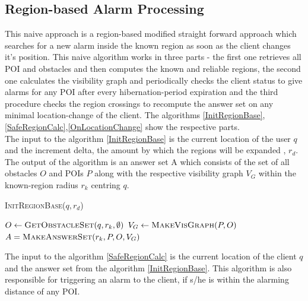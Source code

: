 \documentclass{sig-alternate}
\begin{document}
\subsection{Region-based Alarm Processing}
This naive approach is a region-based modified straight forward approach which searches for a new alarm inside the known region as soon as the client changes it's position.
This naive algorithm works in three parts - the first one retrieves all POI and obstacles and then computes the known and reliable regions, the second one calculates the visibility graph and periodically checks the client status to give alarms for any POI after every hibernation-period expiration and the third procedure checks the region crossings to recompute the answer set on any minimal location-change of the client.
The algorithms \ref{InitRegionBase},\ref{SafeRegionCalc},\ref{OnLocationChange} show the respective parts.\\
The input to the algorithm \ref{InitRegionBase} is the current location of the user $q$ and the increment delta, the amount by which the regions will be expanded , $r_d$. The output of the algorithm is an answer set A which consists of the set of all obstacles $O$ and POIs $P$ along with the respective visibility graph $V_G$ within the known-region radius $r_{k}$ centring $q$.

\begin{algorithm}
\caption{\textsc{InitRegionBase}($q,r_d$)}
\label{InitRegionBase}

    
	 $O \gets \textsc{GetObstacleSet}(q, r_k, \emptyset)$\;
	 $V_G \gets \textsc{MakeVisGraph}(P, O)$	\;
	 \Return $A = \textsc{MakeAnswerSet}(r_k, P, O, V_G)$ 
\end{algorithm}

The input to the algorithm \ref{SafeRegionCalc} is the current location of the client $q$ and the answer set from the algorithm \ref{InitRegionBase}. This algorithm is also responsible for triggering an alarm to the client, if s/he is within the alarming distance of any POI.
\end{document}
